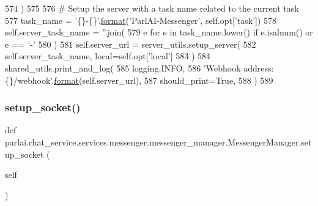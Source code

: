 \begin{DoxyCode}
574         )
575 
576         \textcolor{comment}{# Setup the server with a task name related to the current task}
577         task\_name = \textcolor{stringliteral}{'\{\}-\{\}'}.\hyperlink{namespaceparlai_1_1chat__service_1_1services_1_1messenger_1_1shared__utils_a32e2e2022b824fbaf80c747160b52a76}{format}(\textcolor{stringliteral}{'ParlAI-Messenger'}, self.opt[\textcolor{stringliteral}{'task'}])
578         self.server\_task\_name = \textcolor{stringliteral}{''}.join(
579             e \textcolor{keywordflow}{for} e \textcolor{keywordflow}{in} task\_name.lower() \textcolor{keywordflow}{if} e.isalnum() \textcolor{keywordflow}{or} e == \textcolor{stringliteral}{'-'}
580         )
581         self.server\_url = server\_utils.setup\_server(
582             self.server\_task\_name, local=self.opt[\textcolor{stringliteral}{'local'}]
583         )
584         shared\_utils.print\_and\_log(
585             logging.INFO,
586             \textcolor{stringliteral}{'Webhook address: \{\}/webhook'}.\hyperlink{namespaceparlai_1_1chat__service_1_1services_1_1messenger_1_1shared__utils_a32e2e2022b824fbaf80c747160b52a76}{format}(self.server\_url),
587             should\_print=\textcolor{keyword}{True},
588         )
589 
\end{DoxyCode}
\mbox{\label{classparlai_1_1chat__service_1_1services_1_1messenger_1_1messenger__manager_1_1MessengerManager_aa3762b7362346cdaaf1d1ad0d6372166}} 
\subsubsection{\texorpdfstring{setup\+\_\+socket()}{setup\_socket()}}
{\footnotesize\ttfamily def parlai.\+chat\+\_\+service.\+services.\+messenger.\+messenger\+\_\+manager.\+Messenger\+Manager.\+setup\+\_\+socket (\begin{DoxyParamCaption}\item[{}]{self }\end{DoxyParamCaption})}

